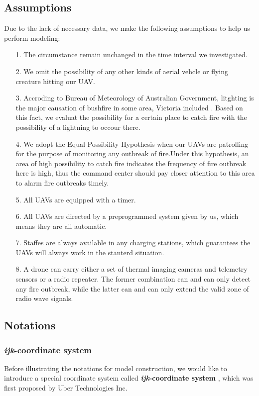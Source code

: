 \documentclass[13pt]{ctexart} %
\begin{document}
\subsection{Assumptions}
Due to the lack of necessary data, we make the following assumptions to help us perform modeling:

\begin{itemize}[itemsep=0.3ex, leftmargin=1.2cm]
    \item[1.] The circumstance remain unchanged in the time interval we investigated.
    \item[2.] We omit the possibility of any other kinds of aerial vehcle or flying creature hitting our UAV.
    \item[3.] Accroding to Bureau of Meteorology of Australian Government, litghting is the major causation of bushfire in some area, Victoria included \cite{au-gov-weather}. Based on this fact, we evaluat the possibility for a certain place to catch fire with the possibility of a lightning to occour there.
    \item[4.]  We adopt the Equal Possibility Hypothesis when our UAVs are patrolling for the purpose of monitoring any outbreak of fire.Under this hypothesis, an area of high possibility to catch fire indicates the frequency of fire outbreak here is high, thus the command center should pay closer attention to this area to alarm fire outbreaks timely.
    \item[5.] All UAVs are equipped with a timer.
    \item[6.] All UAVs are directed by a preprogrammed system given by us, which means they are all automatic.
    \item[7.] Staffes are always available in any charging stations, which guarantees the UAVs will always work in the stanterd situation.
    \item[8.] A drone can carry either a set of thermal imaging cameras and telemetry sensors or a radio repeater. The former combination can and can only detect any fire outbreak, while the latter can and can only extend the valid zone of radio wave signals.
\end{itemize}
\subsection{Notations}
\subsubsection{\textit{ijk}-coordinate system}
Before illustrating the notations for model construction, we would like to introduce a special coordinate system called \textbf{\textit{ijk}-coordinate system} \cite{uber-h3-doc}, which was first proposed by Uber Technologies Inc.
\end{document}
